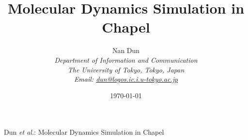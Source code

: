 \documentclass[a4paper,10pt,technote,compsoc,onecolumn]{IEEEtran}
\numberwithin{equation}{section}
\begin{document}
\title{Molecular Dynamics Simulation in Chapel}
\author{{\rm Nan Dun} \\ 
{\it Department of Information and Communication} \\
{\it The University of Tokyo, Tokyo, Japan} \\
{\it Email:
\href{mailto:dun@logos.ic.i.u-tokyo.ac.jp}{dun@logos.ic.i.u-tokyo.ac.jp}} \\
{\date{\today}}
}

%
{Dun \MakeLowercase{\textit{et al.}}: Molecular Dynamics Simulation in Chapel}




\maketitle

\IEEEdisplaynotcompsoctitleabstractindextext
\end{document}
